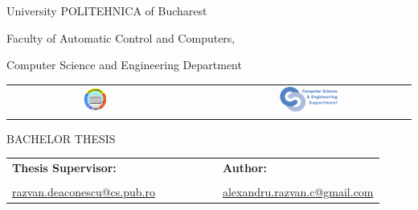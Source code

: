 \begin{titlepage}
	\begin{center}
		{\Large University POLITEHNICA of Bucharest}
		\par\vspace*{2mm}
		{\Large Faculty of Automatic Control and Computers,

		Computer Science and Engineering Department}
		\par\vspace*{3mm}
		\begin{table}[h]
        	\begin{center}
				\begin{tabular}{cccc}
                    \includegraphics[width=0.13\textwidth]{src/img/branding/upb}
					& & &
					\includegraphics[width=0.30\textwidth]{src/img/branding/cs}
            	\end{tabular}
			\end{center}
		\end{table}

		\par\vspace*{35mm}
		{\Huge BACHELOR THESIS}
		\par\vspace*{15mm}
		{\Huge \VARtitleen}
		\par\vspace*{35mm}
		\begin{table}[h]
        	\begin{center}
				\begin{tabular}{lcccccl}
					\Large \textbf{\Large Thesis Supervisor:}
					\vspace*{1mm} &&&&&& \Large \textbf{\Large Author:}\vspace*{1mm} \\
					\Large \VARadviser &&&&&& \Large \VARauthor \vspace*{1mm} \\
					\href{mailto:razvan.deaconescu@cs.pub.ro}{razvan.deaconescu@cs.pub.ro} &&&&&& \href{mailto:alexandru.razvan.c@gmail.com}{alexandru.razvan.c@gmail.com}
				\end{tabular}
			\end{center}
		\end{table}

		\par\vspace*{36mm}
		\Large \VARtitlefooteren
	\end{center}
\end{titlepage}
